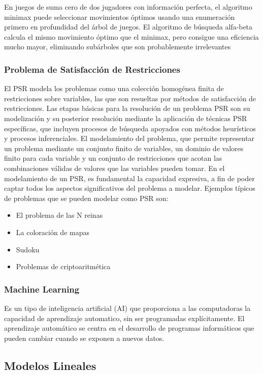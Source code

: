 \documentclass[a4paper]{article}
\begin{document}
En juegos de suma cero de dos jugadores con información perfecta, el algoritmo minimax puede seleccionar movimientos óptimos usando una enumeración primero en profundidad del árbol de juegos.
El algoritmo de búsqueda alfa-beta calcula el mismo movimiento óptimo que el minimax, pero consigue una eficiencia mucho mayor, eliminando subárboles que son probablemente irrelevantes

\subsubsection{Problema de Satisfacci\'on de Restricciones}
El PSR modela los problemas como una colección homogénea finita de restricciones sobre variables, las que son resueltas por métodos de satisfacción de restricciones. Las etapas básicas para la resolución de un problema PSR son su modelización y su posterior resolución mediante la aplicación de técnicas PSR específicas, que incluyen procesos de búsqueda apoyados con métodos heurísticos y procesos inferenciales. El modelamiento del problema, que permite representar un problema mediante un conjunto finito de variables, un dominio de valores finito para cada variable y un conjunto de restricciones que acotan las combinaciones válidas de valores que las variables pueden tomar. En el modelamiento de un PSR, es fundamental la capacidad expresiva, a fin de poder captar todos los aspectos significativos del problema a modelar.
Ejemplos típicos de problemas que se pueden modelar como PSR 
son:
\begin{itemize}
\item El problema de las N reinas
\item La coloración de mapas 
\item Sudoku 
\item Problemas de criptoaritmética
\end{itemize}

\subsubsection{Machine Learning}
Es un tipo de inteligencia artificial (AI) que proporciona a las computadoras la capacidad de aprendizaje automatico, sin ser programadas explícitamente. El aprendizaje automático se centra en el desarrollo de programas informáticos que pueden cambiar cuando se exponen a nuevos datos.

\subsection*{Modelos Lineales}
\end{document}
